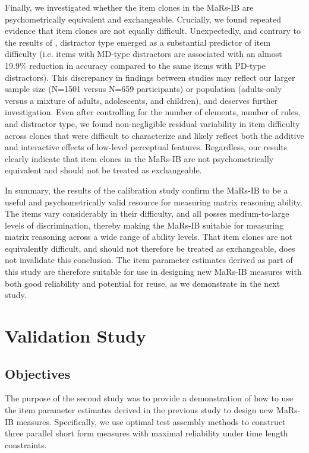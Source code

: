 \documentclass[a4paper,man,natbib]{apa6}
\begin{document}
Finally, we investigated whether the item clones in the MaRs-IB are psychometrically equivalent and exchangeable. Crucially, we found repeated evidence that item clones are not equally difficult. Unexpectedly, and contrary to the results of \cite{chierchia2019matrix}, distractor type emerged as a substantial predictor of item difficulty (i.e. items with MD-type distractors are associated with an almost 19.9\% reduction in accuracy compared to the same items with PD-type distractors). This discrepancy in findings between studies may reflect our larger sample size (N=1501 versus N=659 participants) or population (adults-only versus a mixture of adults, adolescents, and children), and deserves further investigation. Even after controlling for the number of elements, number of rules, and distractor type, we found non-negligible residual variability in item difficulty across clones that were difficult to characterize and likely reflect both the additive and interactive effects of low-level perceptual features. Regardless, our results clearly indicate that item clones in the MaRs-IB are not psychometrically equivalent and should not be treated as exchangeable. 

In summary, the results of the calibration study confirm the MaRs-IB to be a useful and psychometrically valid resource for measuring matrix reasoning ability. The items vary considerably in their difficulty, and all posses medium-to-large levels of discrimination, thereby making the MaRs-IB suitable for measuring matrix reasoning across a wide range of ability levels. That item clones are not equivalently difficult, and should not therefore be treated as exchangeable, does not invalidate this conclusion. The item parameter estimates derived as part of this study are therefore suitable for use in designing new MaRs-IB measures with both good reliability and potential for reuse, as we demonstrate in the next study. 

\section{Validation Study}

\subsection{Objectives}

The purpose of the second study was to provide a demonstration of how to use the item parameter estimates derived in the previous study to design new MaRs-IB measures. Specifically, we use optimal test assembly methods to construct three parallel short form measures with maximal reliability under time length constraints. 
\end{document}
